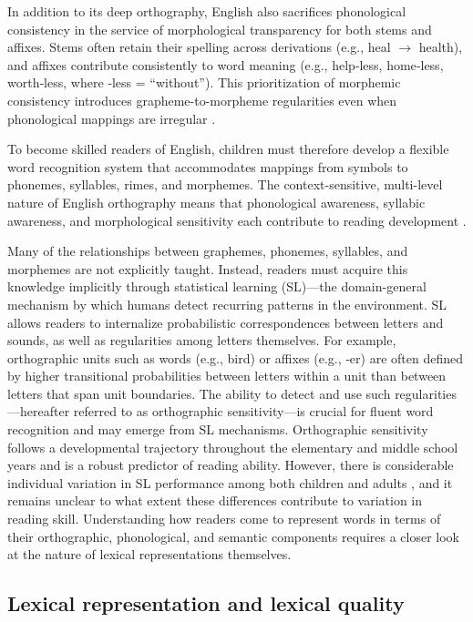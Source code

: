 \documentclass[preprint,12pt, authoryear, review]{elsarticle}
\begin{document}
In addition to its deep orthography, English also sacrifices phonological consistency in the service of morphological transparency for both stems and affixes. Stems often retain their spelling across derivations (e.g., heal $\rightarrow$ health), and affixes contribute consistently to word meaning (e.g., help‑less, home‑less, worth‑less, where ‑less = “without”). This prioritization of morphemic consistency introduces grapheme-to-morpheme regularities even when phonological mappings are irregular \citep{zieglerReadingAcquisitionDevelopmental2005,rastlePlaceMorphologyLearning2019}.

To become skilled readers of English, children must therefore develop a flexible word recognition system that accommodates mappings from symbols to phonemes, syllables, rimes, and morphemes. The context-sensitive, multi-level nature of English orthography means that phonological awareness, syllabic awareness, and morphological sensitivity each contribute to reading development \citep{mahonyReadingAbilitySensitivity2000}.

Many of the relationships between graphemes, phonemes, syllables, and morphemes are not explicitly taught. Instead, readers must acquire this knowledge implicitly through statistical learning (SL)—the domain-general mechanism by which humans detect recurring patterns in the environment. SL allows readers to internalize probabilistic correspondences between letters and sounds, as well as regularities among letters themselves. For example, orthographic units such as words (e.g., bird) or affixes (e.g., ‑er) are often defined by higher transitional probabilities between letters within a unit than between letters that span unit boundaries. The ability to detect and use such regularities—hereafter referred to as orthographic sensitivity—is crucial for fluent word recognition and may emerge from SL mechanisms. Orthographic sensitivity follows a developmental trajectory throughout the elementary and middle school years \citep{treimanSpellingStatisticalLearning2006} and is a robust predictor of reading ability. However, there is considerable individual variation in SL performance among both children and adults \citep{arciuliStatisticalLearningRelated2012}, and it remains unclear to what extent these differences contribute to variation in reading skill. Understanding how readers come to represent words in terms of their orthographic, phonological, and semantic components requires a closer look at the nature of lexical representations themselves.

\subsection{Lexical representation and lexical quality}
\end{document}
